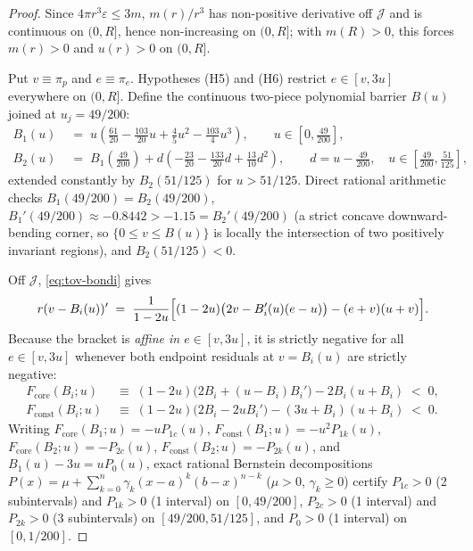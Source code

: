 \documentclass[11pt]{article}
\theoremstyle{plain}
\theoremstyle{definition}
\newcommand{\eps}{\varepsilon}
\begin{document}
\begin{proof}
Since $4\pi r^3 \eps \le 3 m$, $m(r)/r^3$ has non-positive derivative off $\mathcal{J}$ and is continuous on $(0, R]$, hence non-increasing on $(0, R]$; with $m(R) > 0$, this forces $m(r) > 0$ and $u(r) > 0$ on $(0, R]$.

Put $v \equiv \pi_p$ and $e \equiv \pi_e$. Hypotheses (H5) and (H6) restrict $e \in [v, 3u]$ everywhere on $(0, R]$. Define the continuous two-piece polynomial barrier $B(u)$ joined at $u_j = 49/200$:
\begin{align}
  B_1(u) &\;=\; u\!\left(\frac{61}{20} - \frac{103}{20} u + \frac{4}{5} u^2 - \frac{103}{4} u^3\right),
  \qquad u \in \left[0, \frac{49}{200}\right], \label{eq:B1}\\
  B_2(u) &\;=\; B_1\!\left(\frac{49}{200}\right) + d\!\left(-\frac{23}{20} - \frac{133}{20} d + \frac{13}{10} d^2\right),
  \qquad d = u - \frac{49}{200},\quad u \in \left[\frac{49}{200}, \frac{51}{125}\right], \label{eq:B2}
\end{align}
extended constantly by $B_2(51/125)$ for $u > 51/125$. Direct rational arithmetic checks $B_1(49/200) = B_2(49/200)$, $B_1'(49/200) \approx -0.8442 > -1.15 = B_2'(49/200)$ (a strict concave downward-bending corner, so $\{0 \le v \le B(u)\}$ is locally the intersection of two positively invariant regions), and $B_2(51/125) < 0$.

Off $\mathcal{J}$, \eqref{eq:tov-bondi} gives
\begin{equation}
  r(v - B_i(u))' \;=\; \frac{1}{1 - 2u}\Bigl[(1 - 2u)\bigl(2v - B_i'(u)(e - u)\bigr) - (e + v)(u + v)\Bigr].
  \label{eq:barrier-deriv}
\end{equation}
Because the bracket is \emph{affine in $e \in [v, 3u]$}, it is strictly negative for all $e \in [v, 3u]$ whenever both endpoint residuals at $v = B_i(u)$ are strictly negative:
\begin{align*}
  F_{\mathrm{core}}(B_i; u) &\;\equiv\; (1 - 2u)\bigl(2 B_i + (u - B_i) B_i'\bigr) - 2 B_i(u + B_i) \;<\; 0, \\
  F_{\mathrm{const}}(B_i; u) &\;\equiv\; (1 - 2u)\bigl(2 B_i - 2 u B_i'\bigr) - (3u + B_i)(u + B_i) \;<\; 0.
\end{align*}
Writing $F_{\mathrm{core}}(B_1; u) = -u P_{1c}(u)$, $F_{\mathrm{const}}(B_1; u) = -u^2 P_{1k}(u)$, $F_{\mathrm{core}}(B_2; u) = -P_{2c}(u)$, $F_{\mathrm{const}}(B_2; u) = -P_{2k}(u)$, and $B_1(u) - 3u = u P_0(u)$, exact rational Bernstein decompositions $P(x) = \mu + \sum_{k=0}^n \gamma_k (x-a)^k (b-x)^{n-k}$ ($\mu > 0$, $\gamma_k \ge 0$) certify $P_{1c} > 0$ (2 subintervals) and $P_{1k} > 0$ (1 interval) on $[0, 49/200]$, $P_{2c} > 0$ (1 interval) and $P_{2k} > 0$ (3 subintervals) on $[49/200, 51/125]$, and $P_0 > 0$ (1 interval) on $[0, 1/200]$.


\end{proof}
\end{document}
